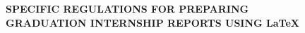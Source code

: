 
%
%
%     
%
%

\clearpage
\thispagestyle{empty}

\begin{center}
    {\fontsize{16pt}{20pt}\selectfont\bfseries
    SPECIFIC REGULATIONS FOR PREPARING\\
    GRADUATION INTERNSHIP REPORTS USING \LaTeX}
\end{center}

\vspace{0.5cm}

